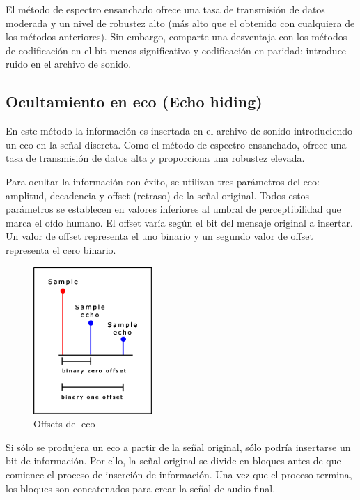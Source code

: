\documentclass[12pt]{article}
\begin{document}
El método de espectro ensanchado ofrece una tasa de transmisión de datos moderada y un nivel de robustez alto (más alto que el obtenido con cualquiera de los métodos anteriores). Sin embargo, comparte una desventaja con los métodos de codificación en el bit menos significativo y codificación en paridad: introduce ruido en el archivo de sonido.

\subsection{Ocultamiento en eco (Echo hiding)}

En este método la información es insertada en el archivo de sonido introduciendo un eco en la señal discreta. Como el método de espectro ensanchado, ofrece una tasa de transmisión de datos alta y proporciona una robustez elevada.

Para ocultar la información con éxito, se utilizan tres parámetros del eco: amplitud, decadencia y offset (retraso) de la señal original. Todos estos parámetros se establecen en valores inferiores al umbral de perceptibilidad que marca el oído humano. El offset varía según el bit del mensaje original a insertar. Un valor de offset representa el uno binario y un segundo valor de offset representa el cero binario.

\begin{figure}
  \centering
    \includegraphics[width=0.4\textwidth]{img/echooffsets}
  \caption{Offsets del eco}
  \label{echooffsets}
\end{figure}

Si sólo se produjera un eco a partir de la señal original, sólo podría insertarse un bit de información. Por ello, la señal original se divide en bloques antes de que comience el proceso de inserción de información. Una vez que el proceso termina, los bloques son concatenados para crear la señal de audio final.
\end{document}
